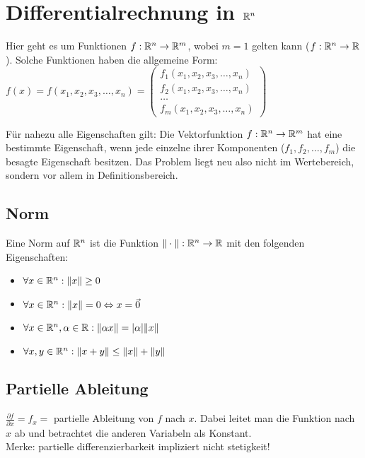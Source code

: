 \section{Differentialrechnung in $\mathbb{R}^n$}
Hier geht es um Funktionen $f: \mathbb{R}^n \to \mathbb{R}^m$, wobei $m=1$ gelten kann
($f: \mathbb{R}^n \to \mathbb{R}$). Solche Funktionen haben die allgemeine Form:
$f(x) = f(x_1, x_2, x_3, \ldots, x_n) = \begin{pmatrix}
f_1(x_1, x_2, x_3, \ldots, x_n)\\
f_2(x_1, x_2, x_3, \ldots, x_n)\\
\ldots\\
f_m(x_1, x_2, x_3, \ldots, x_n)
\end{pmatrix}$

Für nahezu alle Eigenschaften gilt: Die Vektorfunktion $f: \mathbb{R}^n \to \mathbb{R}^m$ hat
eine bestimmte Eigenschaft, wenn jede einzelne ihrer Komponenten
($f_1, f_2, \ldots, f_m$) die besagte Eigenschaft besitzen. Das Problem liegt
neu also nicht im Wertebereich, sondern vor allem in Definitionsbereich.

\subsection{Norm}
Eine Norm auf $\mathbb{R}^n$ ist die Funktion $\|\cdot\|: \mathbb{R}^n \to \mathbb{R}$ mit den folgenden
Eigenschaften:
\begin{itemize}
	\item $\forall x \in \mathbb{R}^n: \|x\| \geq 0$
	\item $\forall x \in \mathbb{R}^n: \|x\| = 0 \Leftrightarrow x = \vec{0}$
	\item $\forall x \in \mathbb{R}^n, \alpha \in \mathbb{R}: \|\alpha x\| = |\alpha| \|x\|$
	\item $\forall x,y \in \mathbb{R}^n: \|x + y\| \leq \|x\|+\|y\|$
\end{itemize}

\subsection{Partielle Ableitung}
$\frac{\partial f}{\partial x} = f_{x} = $ partielle Ableitung von $f$ nach $x$. Dabei leitet man die Funktion nach $x$ ab und betrachtet die anderen Variabeln als Konstant. \\
Merke: partielle differenzierbarkeit impliziert nicht stetigkeit!


